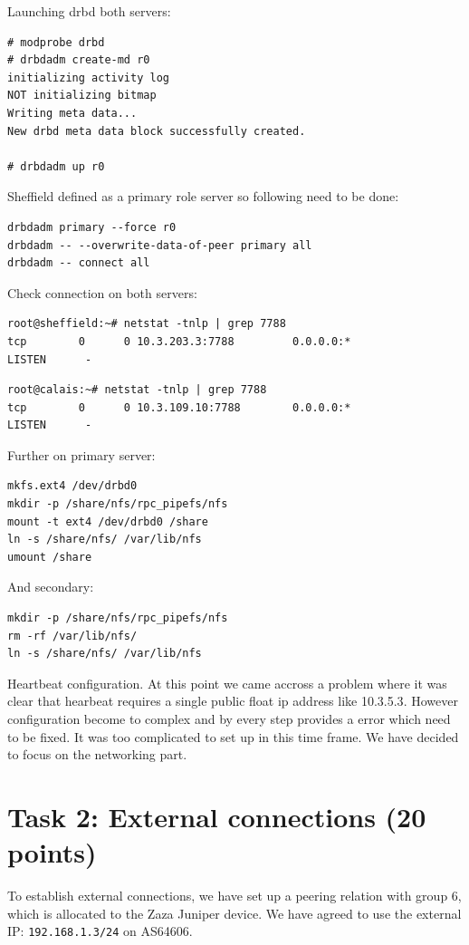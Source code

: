 \documentclass[10pt,a4paper]{article}
\begin{document}
Launching drbd both servers:
\begin{verbatim}
# modprobe drbd
# drbdadm create-md r0
initializing activity log
NOT initializing bitmap
Writing meta data...
New drbd meta data block successfully created.

# drbdadm up r0
\end{verbatim}

Sheffield defined as a primary role server so following need to be done:
\begin{verbatim}
drbdadm primary --force r0
drbdadm -- --overwrite-data-of-peer primary all
drbdadm -- connect all
\end{verbatim}

Check connection on both servers:
\begin{verbatim}
root@sheffield:~# netstat -tnlp | grep 7788
tcp        0      0 10.3.203.3:7788         0.0.0.0:*               LISTEN      -
\end{verbatim}

\begin{verbatim}
root@calais:~# netstat -tnlp | grep 7788
tcp        0      0 10.3.109.10:7788        0.0.0.0:*               LISTEN      -
\end{verbatim}

Further on primary server:
\begin{verbatim}
mkfs.ext4 /dev/drbd0
mkdir -p /share/nfs/rpc_pipefs/nfs
mount -t ext4 /dev/drbd0 /share
ln -s /share/nfs/ /var/lib/nfs
umount /share
\end{verbatim}

And secondary:
\begin{verbatim}
mkdir -p /share/nfs/rpc_pipefs/nfs
rm -rf /var/lib/nfs/
ln -s /share/nfs/ /var/lib/nfs
\end{verbatim}

Heartbeat configuration. At this point we came accross a problem where it was clear that hearbeat requires a single public float ip address like 10.3.5.3\cite{BRBD}. However configuration become to complex and by every step provides a error which need to be fixed. It was too complicated to set up in this time frame. We have decided to focus on the networking part.




\section{Task 2: External connections (20 points)}
To establish external connections, we have set up a peering relation with group 6, which is allocated to the Zaza Juniper device. We have agreed to use the external IP: \texttt{192.168.1.3/24} on AS64606.
\end{document}
